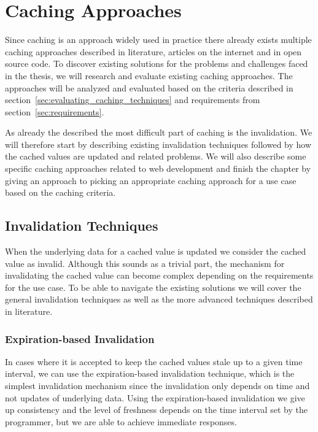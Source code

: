 \chapter{Caching Approaches}
\label{chapter:caching}

Since caching is an approach widely used in practice there already exists multiple caching approaches described in literature, articles on the internet and in open source code. To discover existing solutions for the problems and challenges faced in the thesis, we will research and evaluate existing caching approaches. The approaches will be analyzed and evaluated based on the criteria described in section~\ref{sec:evaluating_caching_techniques} and  requirements from section~\ref{sec:requirements}.

As already the described the most difficult part of caching is the invalidation. We will therefore start by describing existing invalidation techniques followed by how the cached values are updated and related problems. We will also describe some specific caching approaches related to web development and finish the chapter by giving an approach to picking an appropriate caching approach for a use case based on the caching criteria.

\section{Invalidation Techniques}
\label{sec:invalidation_techniques}

When the underlying data for a cached value is updated we consider the cached value as invalid. Although this sounds as a trivial part, the mechanism for invalidating the cached value can become complex depending on the requirements for the use case. To be able to navigate the existing solutions we will cover the general invalidation techniques as well as the more advanced techniques described in literature.


\subsection{Expiration-based Invalidation}
\label{subsec:expiration_based_invalidation}

In cases where it is accepted to keep the cached values stale up to a given time interval, we can use the expiration-based invalidation technique, which is the simplest invalidation mechanism since the invalidation only depends on time and not updates of underlying data. Using the expiration-based invalidation we give up consistency and the level of freshness depends on the time interval set by the programmer, but we are able to achieve immediate responses.

